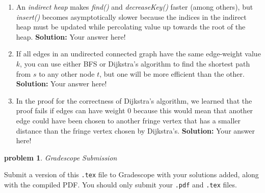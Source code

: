 \documentclass[10pt]{article}
\newcommand{\solution}[1]{\color{blue}\hfill\break\noindent\textbf{Solution:} #1\color{black}}
\newtheorem{problem}{\sc\color{cit}problem}
\begin{document}
\begin{enumerate}
\renewcommand{\theenumi}{\Alph{enumi}}

\item An \emph{indirect heap} makes \emph{find()} and \emph{decreaseKey()} faster (among others), but \emph{insert()\/} becomes asymptotically slower because the indices in the indirect heap must be updated while percolating value up towards the root of the heap.
\solution{
    Your answer here!
}

\item If all edges in an undirected connected graph have the same edge-weight value $k$, you can use either BFS or Dijkstra's algorithm to find the shortest path from $s$ to any other node $t$, but one will be more efficient than the other.
\solution{
    Your answer here!
}

\item In the proof for the correctness of Dijkstra's algorithm, we learned that the proof fails if edges can have weight $0$ because this would mean that another edge could have been chosen to another fringe vertex that has a smaller distance than the fringe vertex chosen by Dijkstra's.
\solution{
    Your answer here!
}

\end{enumerate}

  

\begin{problem} Gradescope Submission \end{problem}
Submit a version of this \verb|.tex| file to Gradescope with your solutions added, along with the compiled PDF.  You should only submit your \verb|.pdf| and \verb|.tex| files.
\end{document}
